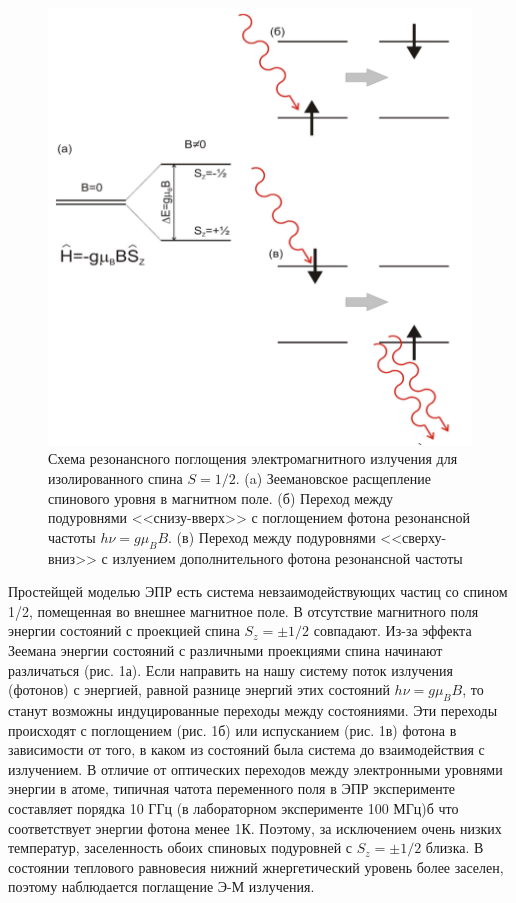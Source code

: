 \documentclass[a4paper]{article}
\begin{document}
\begin{figure}[H]
    \begin{center}
    \includegraphics[scale = 0.8]{respogl.png}
    \caption{Схема резонансного поглощения электромагнитного излучения для изолированного спина $S = 1/2$. (a) Зеемановское расщепление спинового уровня в магнитном поле. (б) Переход между подуровнями <<снизу-вверх>> с поглощением фотона резонансной частоты $h \nu = g \mu_B B$. (в) Переход между подуровнями <<сверху-вниз>> с излуением дополнительного фотона резонансной частоты}
    \label{respogl}
    \end{center}
\end{figure}

Простейщей моделью ЭПР есть система невзаимодействующих частиц со спином 1/2, помещенная во внешнее магнитное поле. 
В отсутствие магнитного поля энергии состояний с проекцией спина $S_z = \pm 1/2$ совпадают. Из-за эффекта Зеемана энергии 
состояний с различными проекциями спина начинают различаться (рис. 1а).
Если направить на нашу систему поток излучения (фотонов) с энергией, равной разнице энергий этих состояний $h \nu = g \mu_B B$, то 
станут возможны индуцированные переходы между состояниями. Эти переходы происходят с поглощением (рис. 1б) или 
испусканием (рис. 1в) фотона в зависимости от того, в каком из состояний была система до взаимодействия с излучением.
В отличие от оптических переходов между электронными уровнями энергии в атоме, типичная чатота переменного поля в ЭПР эксперименте 
составляет порядка 10 ГГц (в лабораторном эксперименте 100 МГц)б что соответствует энергии фотона менее 1К. Поэтому, 
за исключением очень низких температур, заселенность обоих спиновых подуровней с $S_z = \pm 1/2$ близка. 
В состоянии теплового равновесия нижний жнергетический уровень более заселен, поэтому наблюдается поглащение  Э-М излучения.
\end{document}
